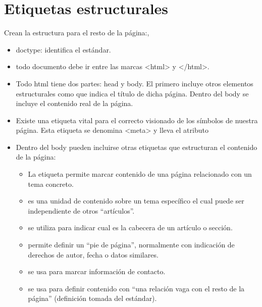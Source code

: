\documentclass[letterpaper,10pt,spanish]{sphinxmanual}
\begin{document}
\section{Etiquetas estructurales}
\label{tema2:etiquetas-estructurales}
Crean la estructura para el resto de la página:,
\begin{itemize}
\item {} 
doctype: identifica el estándar.

\item {} 
todo documento debe ir entre las marcas \textless{}html\textgreater{} y \textless{}/html\textgreater{}.

\item {} 
Todo html tiene dos partes: head y body. El primero incluye otros elementos estructurales como  que indica el título de dicha página. Dentro del body se incluye el contenido real de la página.

\item {} 
Existe una etiqueta vital para el correcto visionado de los símbolos de nuestra página. Esta etiqueta se denomina \textless{}meta\textgreater{} y lleva el atributo 

\item {} 
Dentro del body pueden incluirse otras etiquetas que estructuran el contenido de la página:
\begin{itemize}
\item {} 
La etiqueta  permite marcar contenido de una página relacionado con un tema concreto.

\item {} 
 es una unidad de contenido sobre un tema específico el cual puede ser independiente de otros ``artículos''.

\item {} 
 se utiliza para indicar cual es la cabecera de un artículo o sección.

\item {} 
 permite definir un ``pie de página'', normalmente con indicación de derechos de autor, fecha o datos similares.

\item {} 
 se usa para marcar información de contacto.

\item {} 
 se usa para definir contenido con ``una relación vaga con el resto de la página'' (definición tomada del estándar).


\end{itemize}
\end{itemize}
\end{document}
